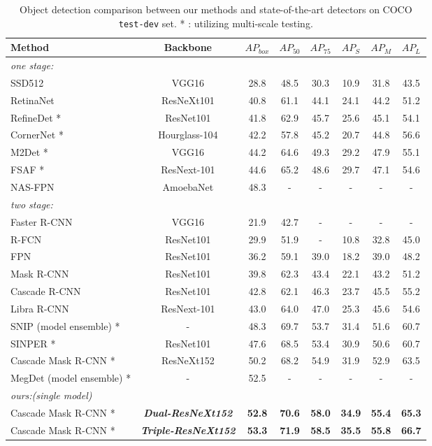 \documentclass[letterpaper]{article} \usepackage{aaai20}  \usepackage{multirow}
\begin{document}
\begin{table*}[t]
	\centering
	\small
\begin{tabular}{l|c|ccc|ccc}
\toprule
		Method & Backbone &$AP_{box}$ & $AP_{50}$ & $AP_{75}$ & $AP_{S}$ & $AP_{M}$ & $AP_{L}$  \\ \hline
\textit{one stage:} & & & & & & \\
		SSD512 \cite{liu2015ssd}&VGG16 &28.8 & 48.5 & 30.3 & 10.9 & 31.8 & 43.5 \\
		RetinaNet \cite{lin2017focal}&ResNeXt101&40.8 &61.1 & 44.1&24.1 &44.2 & 51.2\\
		RefineDet \cite{zhang2018single}*& ResNet101&41.8 & 62.9 & 45.7 & 25.6 & 45.1 & 54.1 \\
		CornerNet \cite{zhang2018single}*& Hourglass-104 &42.2&57.8&45.2&20.7&44.8&56.6 \\
		M2Det \cite{zhao2018m2det}*&VGG16&44.2&64.6&49.3&29.2&47.9&55.1\\
		FSAF \cite{zhu2019feature}*&ResNext-101&44.6&65.2&48.6&29.7&47.1&54.6\\
		NAS-FPN \cite{ghiasi2019fpn}&AmoebaNet&48.3&- &- & -&- &-\\
		\hline
		\textit{two stage:} & & & & & & \\
		Faster R-CNN \cite{ren2015faster}&VGG16 & 21.9 & 42.7&- &- &- &- \\
		R-FCN \cite{dai2016r}&ResNet101&29.9&51.9 &- &10.8 &32.8 & 45.0\\
		FPN \cite{lin2017feature}&ResNet101&36.2&59.1 &39.0 &18.2 &39.0 & 48.2\\
		Mask R-CNN \cite{he2017mask}&ResNet101&39.8 & 62.3 & 43.4 & 22.1 & 43.2& 51.2 \\
		Cascade R-CNN \cite{cai18cascadercnn}&ResNet101&42.8 &62.1&46.3&23.7&45.5&55.2  \\
		Libra R-CNN \cite{pang2019libra}&ResNext-101&43.0&64.0&47.0&25.3&45.6&54.6\\
		SNIP (model ensemble) \cite{singh2018analysis}*&- &48.3 & 69.7 & 53.7 & 31.4 & 51.6 & 60.7 \\
		SINPER \cite{singh2018sniper}*&ResNet101&47.6 &68.5 &53.4 &30.9 &50.6&60.7 \\
		Cascade Mask R-CNN \cite{Detectron2018}*&ResNeXt152 & 50.2 & 68.2 & 54.9 & 31.9 & 52.9 & 63.5\\
		MegDet (model ensemble) \cite{peng2018megdet}* & - & 52.5 & - & - & - & - & - \\
		\hline
		\textit{ours:(single model)} & & & & & & \\
		Cascade Mask R-CNN * &\textbf{\textit{Dual-ResNeXt152}}&\textbf{52.8} & \textbf{70.6} & \textbf{58.0} & \textbf{34.9} & \textbf{55.4} & \textbf{65.3}\\
		Cascade Mask R-CNN * &\textbf{\textit{Triple-ResNeXt152}}& \textbf{53.3} & \textbf{71.9} & \textbf{58.5} & \textbf{35.5} & \textbf{55.8} & \textbf{66.7}\\
\bottomrule
	\end{tabular}
	\caption{Object detection comparison between our methods and state-of-the-art detectors on COCO \texttt{test-dev} set. * : utilizing multi-scale testing.} \label{table:detection compare} \end{table*}
\end{document}
